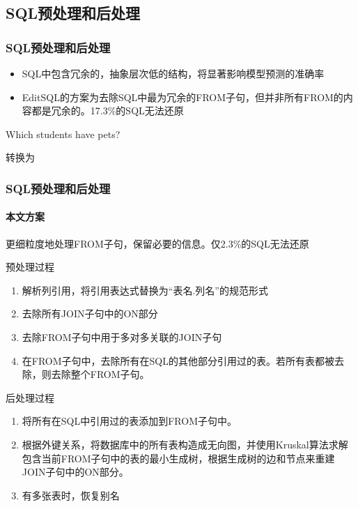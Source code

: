 \documentclass{ctexbeamer}
\begin{document}
\subsection{SQL预处理和后处理}
\begin{frame}
  \frametitle{SQL预处理和后处理}
  \begin{itemize}
    \item SQL中包含冗余的，抽象层次低的结构，将显著影响模型预测的准确率
    \item EditSQL的方案为去除SQL中最为冗余的FROM子句，但并非所有FROM的内容都是冗余的。17.3\%的SQL无法还原
  \end{itemize}
  \begin{example}[去掉FROM子句后将丢失信息]
    Which students have pets?

    \vspace{0.2cm}

    转换为

  \end{example}
\end{frame}
\begin{frame}
  \frametitle{SQL预处理和后处理}
  \framesubtitle{本文方案}
  更细粒度地处理FROM子句，保留必要的信息。仅2.3\%的SQL无法还原

  预处理过程
  \begin{enumerate}
    \item 解析列引用，将引用表达式替换为“表名.列名”的规范形式
    \item 去除所有JOIN子句中的ON部分
    \item 去除FROM子句中用于多对多关联的JOIN子句
    \item 在FROM子句中，去除所有在SQL的其他部分引用过的表。若所有表都被去除，则去除整个FROM子句。
  \end{enumerate}
  后处理过程
  \begin{enumerate}
    \item 将所有在SQL中引用过的表添加到FROM子句中。
    \item 根据外键关系，将数据库中的所有表构造成无向图，并使用Kruskal算法求解包含当前FROM子句中的表的最小生成树，根据生成树的边和节点来重建JOIN子句中的ON部分。
    \item 有多张表时，恢复别名
  \end{enumerate}
\end{frame}
\end{document}
